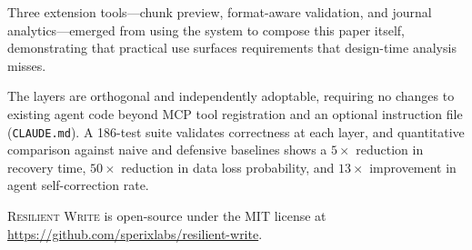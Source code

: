 \documentclass[11pt,twocolumn]{article}
\begin{document}
Three extension tools---chunk preview, format-aware validation,
and journal analytics---emerged from using the system to compose
this paper itself, demonstrating that practical use surfaces
requirements that design-time analysis misses.

The layers are orthogonal and independently adoptable, requiring no
changes to existing agent code beyond MCP tool registration and an
optional instruction file (\texttt{CLAUDE.md}).  A 186-test suite
validates correctness at each layer, and quantitative comparison
against naive and defensive baselines shows a $5\times$ reduction in
recovery time, $50\times$ reduction in data loss probability, and
$13\times$ improvement in agent self-correction rate.

\textsc{Resilient Write} is open-source under the MIT license at
\url{https://github.com/sperixlabs/resilient-write}.

\balance
\begingroup
\sloppy


\endgroup
\end{document}
